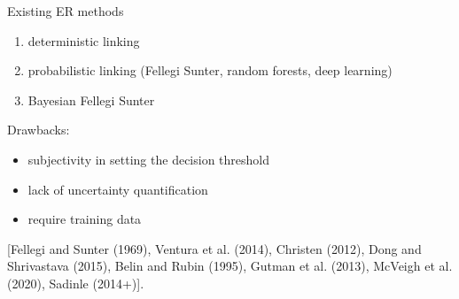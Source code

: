 \documentclass[compress]{beamer}
\newcommand{\1}[1]{\mathbb{I}\!\left[#1\right]} %
\theoremstyle{plain}
\begin{document}


\begin{frame}{Existing ER methods}
  \begin{enumerate}
   \item deterministic linking
   \item probabilistic linking (Fellegi Sunter, random forests, deep learning)
   \item Bayesian Fellegi Sunter 
  \end{enumerate}
  \pause

\vspace*{1em}
  Drawbacks:\\
  \begin{itemize}
    \item subjectivity in setting the decision threshold
    \item lack of uncertainty quantification
    \item require training data
  \end{itemize}
\vspace*{1em}
[Fellegi and Sunter (1969), Ventura et al. (2014), Christen (2012), Dong and Shrivastava (2015), Belin and Rubin (1995), Gutman et al. (2013), McVeigh et al. (2020), Sadinle (2014+)]. 
\end{frame}
\end{document}
